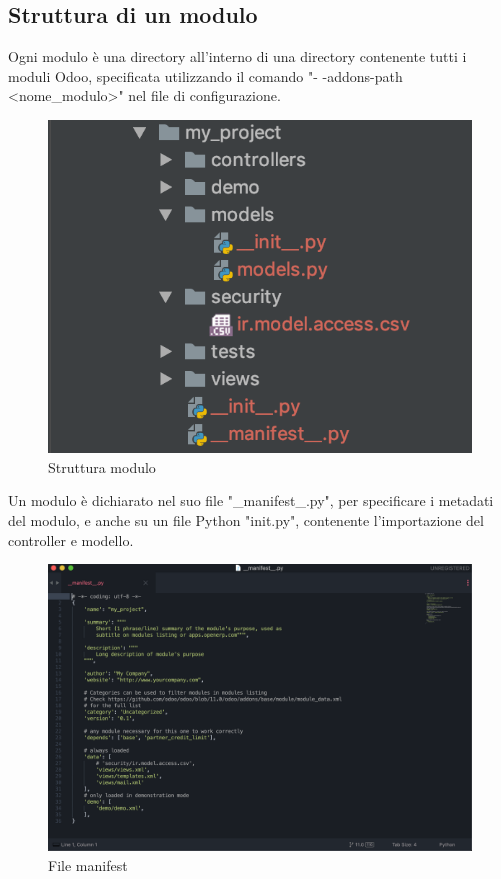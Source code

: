 \subsection{Struttura di un modulo}
Ogni modulo è una directory all'interno di una directory contenente tutti i moduli Odoo, specificata utilizzando il comando "- -addons-path <nome\_modulo>" nel file di configurazione.
\begin{figure}[H]
	\begin{center} \includegraphics[scale=0.5]{figures/structure_odoo}
		\caption[Struttura di un modulo]{Struttura modulo}
		\label{fig:structure_odoo}
	\end{center}
\end{figure}

Un modulo è dichiarato nel suo file "\_manifest\_.py", per specificare i metadati del modulo, e anche su un file Python "init.py", contenente l'importazione del controller e modello.
\begin{figure}[H]
	\begin{center} \includegraphics[scale=0.4]{figures/manifest}
		\caption[File manifest]{File manifest}
		\label{fig:manifest}
	\end{center}
\end{figure}

